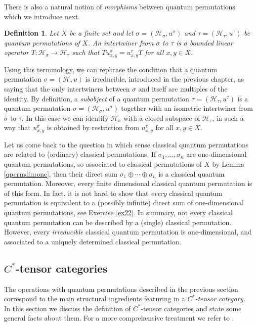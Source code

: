 \documentclass[a4paper]{amsart}
\newcommand*{\Hc}{\mathcal{H}}
\numberwithin{equation}{section}
\theoremstyle{change}
\newtheorem{definition}[theorem]{Definition}
\begin{document}
There is also a natural notion of \emph{morphisms} between quantum permutations which we introduce next. 

\begin{definition} \label{defintertwiner}
Let $ X $ be a finite set and let $ \sigma = (\Hc_\sigma, u^\sigma) $ and $ \tau = (\Hc_\tau, u^\tau) $ be quantum permutations of $ X $. 
An intertwiner from $ \sigma $ to $ \tau $ is a bounded linear operator $ T: \Hc_\sigma \rightarrow \Hc_\tau $ such that $ T u^\sigma_{x,y} = u^\tau_{x,y} T $ 
for all $ x, y \in X $. 
\end{definition} 

Using this terminology, we can rephrase the condition that a quantum permutation $ \sigma = (\Hc, u) $ is irreducible, introduced in the previous chapter, as saying that the only intertwiners between $ \sigma $ and itself are multiples of the identity. By definition, a \emph{subobject} of a quantum permutation $ \tau = (\Hc_\tau, u^\tau) $ is a quantum permutation $ \sigma = (\Hc_\sigma, u^\sigma) $ together with an isometric intertwiner from $ \sigma $ to $ \tau $. In this case we can identify $ \Hc_\sigma $ with a closed subspace of $ \Hc_\tau $, in such a way that $ u^\sigma_{x,y} $ is obtained by restriction from $ u^\tau_{x,y} $ for all $ x,y \in X $. 

Let us come back to the question in which sense classical quantum permutations are related to (ordinary) classical permutations. 
If $ \sigma_1, \dots, \sigma_n $ are one-dimensional quantum permutations, so associated to classical permutations of $ X $ by Lemma \ref{qpermdimone}, 
then their direct sum $ \sigma_1 \oplus \cdots \oplus \sigma_n $ is a classical quantum permutation. Moreover, every finite dimensional classical quantum permutation is of this form. In fact, it is not hard to show that \emph{every} classical quantum permutation is equivalent to a (possibly infinite) direct sum of one-dimensional quantum permutations, see Exercise \ref{ex22}. In summary, not every classical quantum permutation can be described by a (single) classical permutation. However, every \emph{irreducible} classical quantum permutation 
is one-dimensional, and associated to a uniquely determined classical permutation.  


\subsection{$ C^* $-tensor categories} 

The operations with quantum permutations described in the previous section correspond to the main structural ingredients featuring in a \emph{$ C^* $-tensor category}. In this section we discuss the definition of $ C^* $-tensor categories and state some general facts about them. For a more comprehensive treatment we refer to \cite{NESHVEYEV_TUSET_compactquantumgroups}. 
\end{document}
